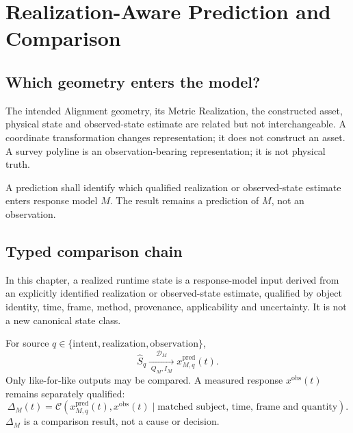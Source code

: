 \chapter{Realization-Aware Prediction and Comparison}
\label{chap:realization-aware-dynamics}

\section*{Which geometry enters the model?}

The intended Alignment geometry, its Metric Realization, the constructed
asset, physical state and observed-state estimate are related but not
interchangeable. A coordinate transformation changes representation; it does
not construct an asset. A survey polyline is an observation-bearing
representation; it is not physical truth.

\begin{principle}
\label{princ:realization-aware-dynamics}
A prediction shall identify which qualified realization or observed-state
estimate enters response model \(M\). The result remains a prediction of
\(M\), not an observation.
\end{principle}

\section{Typed comparison chain}

\begin{definition}
\label{def:realized-runtime-state}
In this chapter, a realized runtime state is a response-model input derived
from an explicitly identified realization or observed-state estimate,
qualified by object identity, time, frame, method, provenance, applicability
and uncertainty. It is not a new canonical state class.
\end{definition}

For source \(q\in\{\mathrm{intent},\mathrm{realization},
\mathrm{observation}\}\),
\[
\widehat S_q
\xrightarrow[\;Q_M,I_M\;]{\mathcal D_M}
x_{M,q}^{\mathrm{pred}}(t).
\]
Only like-for-like outputs may be compared. A measured response
\(x^{\mathrm{obs}}(t)\) remains separately qualified:
\[
\Delta_M(t)=
\mathcal C\!\left(x_{M,q}^{\mathrm{pred}}(t),
x^{\mathrm{obs}}(t)\mid
\text{matched subject, time, frame and quantity}\right).
\]
\(\Delta_M\) is a comparison result, not a cause or decision.

